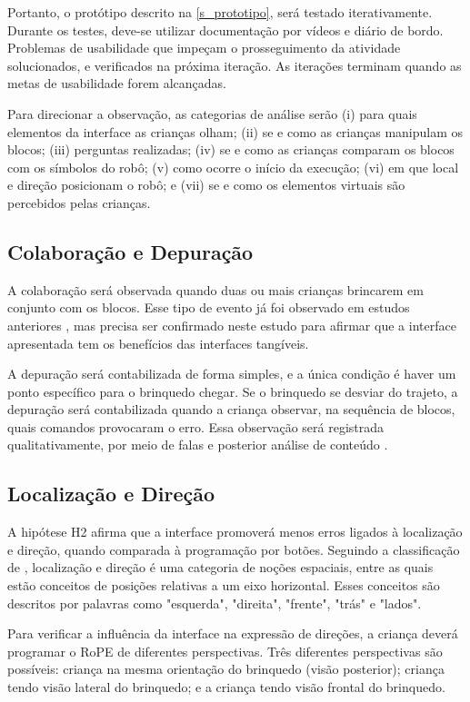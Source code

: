 Portanto, o protótipo descrito na \autoref{s_prototipo}, será testado iterativamente. Durante os testes, deve-se utilizar documentação por vídeos e diário de bordo. Problemas de usabilidade que impeçam o prosseguimento da atividade  solucionados, e verificados na próxima iteração. As iterações terminam quando as metas de usabilidade forem alcançadas.

Para direcionar a observação, as categorias de análise serão (i) 
para quais elementos da interface as crianças olham;
(ii) se e como as crianças manipulam os blocos; (iii) perguntas realizadas; (iv) se e como as crianças comparam os blocos com os símbolos do robô; (v) como ocorre o início da execução; (vi) em que local e direção posicionam o robô; e (vii) se e como os elementos virtuais são percebidos pelas crianças.

\subsection{Colaboração e Depuração}

A colaboração será observada quando duas ou mais crianças brincarem em conjunto com os blocos. Esse tipo de evento já foi observado em estudos anteriores \cite{sapounidis_tangible_2019, raabe_estudo_2019}, mas precisa ser confirmado neste estudo para afirmar que a interface apresentada tem os benefícios das interfaces tangíveis. 

A depuração será contabilizada de forma simples, e a única condição é haver um ponto específico para o brinquedo chegar. Se o brinquedo se desviar do trajeto, a depuração será contabilizada quando a criança observar, na sequência de blocos, quais comandos provocaram o erro. Essa observação será registrada qualitativamente, por meio de falas e posterior análise de conteúdo \cite{bardin_alise_1979}.

\subsection{Localização e Direção}
A hipótese H2 afirma que a interface promoverá menos erros ligados à localização e direção, quando comparada à programação por botões. Seguindo a classificação de , localização e direção é uma categoria de noções espaciais, entre as quais estão conceitos de posições relativas a um eixo horizontal. Esses conceitos são descritos por palavras como "esquerda", "direita", "frente", "trás" e "lados". 

Para verificar a influência da interface na expressão de direções, a criança deverá programar o RoPE de diferentes perspectivas. Três diferentes perspectivas são possíveis: criança na mesma orientação do brinquedo (visão posterior); criança tendo visão lateral do brinquedo; e a criança tendo visão frontal do brinquedo.

